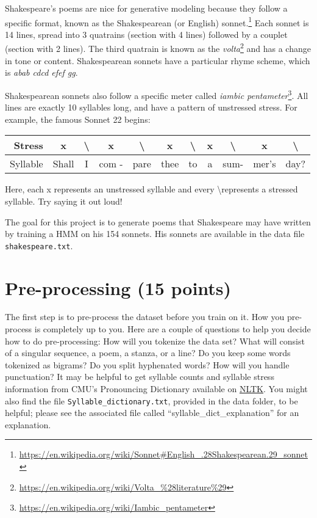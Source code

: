Shakespeare's poems are nice for generative modeling because they follow a specific format, known as the Shakespearean (or English) sonnet.\footnote{\url{https://en.wikipedia.org/wiki/Sonnet\#English\_.28Shakespearean.29\_sonnet}} Each sonnet is 14 lines, spread into 3 quatrains (section with 4 lines) followed by a couplet (section with 2 lines). The third quatrain is known as the \emph{volta}\footnote{\url{https://en.wikipedia.org/wiki/Volta\_\%28literature\%29}} and has a change in tone or content. Shakespearean sonnets have a particular rhyme scheme, which is \emph{abab cdcd efef gg}.

Shakespearean sonnets also follow a specific meter called \emph{iambic pentameter}\footnote{\url{https://en.wikipedia.org/wiki/Iambic_pentameter}}. All lines are exactly 10 syllables long, and have a pattern of unstressed stress. For example, the famous Sonnet 22 begins:

\begin{table}[H]
    \label{tab:meter}
    \centering

    \begin{tabular}{|r|c|c|c|c|c|c|c|c|c|c|}

    \hline
    Stress & x & \textbackslash & x & \textbackslash & x & \textbackslash & x & \textbackslash & x & \textbackslash \\
    \hline
    Syllable & Shall & I & com - &pare & thee & to & a & sum-&mer's & day?\\
    \hline

    \end{tabular}
\end{table}

Here, each x represents an unstressed syllable and every \textbackslash represents a stressed syllable. Try saying it out loud!

The goal for this project is to generate poems that Shakespeare may have written by training a HMM on his 154 sonnets. His sonnets are available in the data file \texttt{shakespeare.txt}.

\section{Pre-processing (15 points)}

The first step is to pre-process the dataset before you train on it. How you pre-process is completely up to you. Here are a couple of questions to help you decide how to do pre-processing: How will you tokenize the data set? What will consist of a singular sequence, a poem, a stanza, or a line? Do you keep some words tokenized as bigrams? Do you split hyphenated words? How will you handle punctuation? It may be helpful to get syllable counts and syllable stress information from CMU's Pronouncing Dictionary available on \href{http://www.nltk.org/_modules/nltk/corpus/reader/cmudict.html}{NLTK}. You might also find the file \texttt{Syllable\_dictionary.txt}, provided in the data folder, to be helpful; please see the associated file called ``syllable\_dict\_explanation'' for an explanation.


